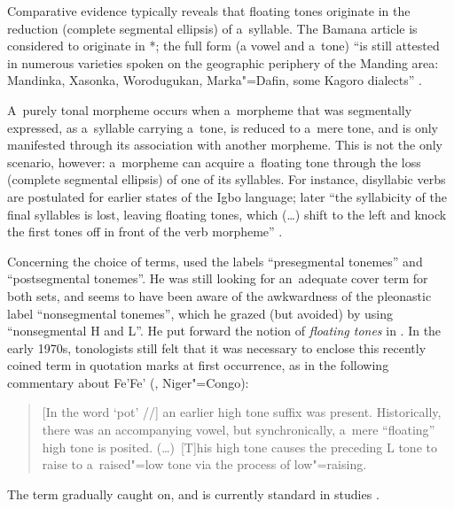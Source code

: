 Comparative evidence typically reveals that floating tones originate in the reduction (complete segmental ellipsis) of a~syllable. The Bamana article is considered to originate in *; the full form (a vowel and a~tone) “is still attested in numerous varieties spoken on the geographic periphery of the Manding area: {Mandinka}, Xasonka, Worodugukan, Marka"=Dafin, some Kagoro dialects” \citep{vydrin2016}. 

A~purely tonal morpheme occurs when a~morpheme that was segmentally expressed, as a~syllable carrying a~tone, is reduced to a~mere tone, and is only manifested through its association with another morpheme. This is not the only scenario, however: a~morpheme can acquire a~floating tone through the loss (complete segmental ellipsis) of one of its syllables. For instance, disyllabic verbs are postulated for earlier states of the Igbo language; later “the syllabicity of the final syllables is lost, leaving floating tones, which ({\dots}) shift to the left and knock the first tones off in front of the verb morpheme” \citep[94]{hymanetal1974}. 

Concerning the choice of terms, \citet[424]{voorhoeve1967} used the labels “presegmental tonemes” and “postsegmental tonemes”. He was still looking for an~adequate cover term for both sets, and seems to have been aware of the awkwardness of the pleonastic label “nonsegmental tonemes”, which he grazed (but avoided) by using “nonsegmental H and L”. He put forward the notion of \textit{floating tones} in \citeyear{voorhoeve1971}. In the early 1970s, tonologists still felt that it was necessary to enclose this recently coined term in quotation marks at first occurrence, as in the following commentary about Fe’Fe’ (, Niger"=Congo): 

\begin{quotation}
	[In the word ‘pot’ //] an earlier high tone {suffix} was present. Historically, there was an accompanying vowel, but synchronically, a~mere “{floating}” high tone is posited. ({\dots})~[T]his high tone causes the preceding L tone to raise to a~raised"=low tone via the process of low"=raising. \citep[86]{hymanetal1974}
\end{quotation}

The term gradually caught on, and is currently standard in  studies \citep[see e.g.][33]{franichetal2012}.


